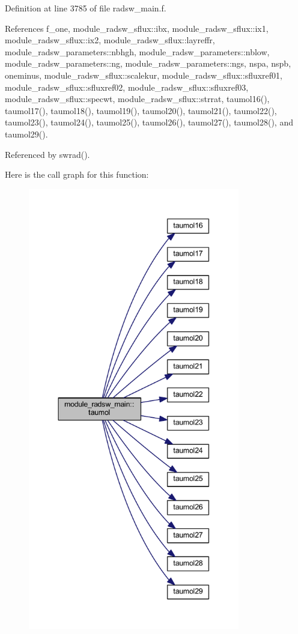 Definition at line 3785 of file radsw\+\_\+main.\+f.



References f\+\_\+one, module\+\_\+radsw\+\_\+sflux\+::ibx, module\+\_\+radsw\+\_\+sflux\+::ix1, module\+\_\+radsw\+\_\+sflux\+::ix2, module\+\_\+radsw\+\_\+sflux\+::layreffr, module\+\_\+radsw\+\_\+parameters\+::nbhgh, module\+\_\+radsw\+\_\+parameters\+::nblow, module\+\_\+radsw\+\_\+parameters\+::ng, module\+\_\+radsw\+\_\+parameters\+::ngs, nspa, nspb, oneminus, module\+\_\+radsw\+\_\+sflux\+::scalekur, module\+\_\+radsw\+\_\+sflux\+::sfluxref01, module\+\_\+radsw\+\_\+sflux\+::sfluxref02, module\+\_\+radsw\+\_\+sflux\+::sfluxref03, module\+\_\+radsw\+\_\+sflux\+::specwt, module\+\_\+radsw\+\_\+sflux\+::strrat, taumol16(), taumol17(), taumol18(), taumol19(), taumol20(), taumol21(), taumol22(), taumol23(), taumol24(), taumol25(), taumol26(), taumol27(), taumol28(), and taumol29().



Referenced by swrad().



Here is the call graph for this function\+:
\nopagebreak
\begin{figure}[H]
\begin{center}
\leavevmode
\includegraphics[height=550pt]{namespacemodule__radsw__main_afbfb76d4fab10254e065dce350ae5f2b_cgraph}
\end{center}
\end{figure}




